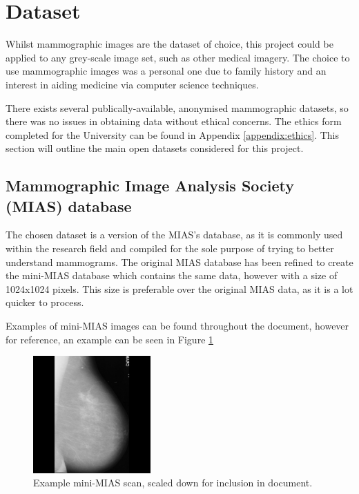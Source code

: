 \section{Dataset}

Whilst \gls{mammographic images} are the dataset of choice, this project could be applied to any grey-scale image set, such as other medical imagery. The choice to use \gls{mammographic images} was a personal one due to family history and an interest in aiding medicine via computer science techniques.

There exists several publically-available, anonymised mammographic datasets, so there was no issues in obtaining data without ethical concerns. The ethics form completed for the University can be found in Appendix \ref{appendix:ethics}. This section will outline the main open datasets considered for this project.

\subsection{Mammographic Image Analysis Society (MIAS) database}

The chosen dataset is a version of the \acrfull{MIAS}'s database, as it is commonly used within the research field and compiled for the sole purpose of trying to better understand mammograms. The original \acrshort{MIAS} database has been refined to create the mini-\acrshort{MIAS} database which contains the same data, however with a size of 1024x1024 pixels. This size is preferable over the original \acrshort{MIAS} data, as it is a lot quicker to process.

Examples of mini-\acrshort{MIAS} images can be found throughout the document, however for reference, an example can be seen in Figure \ref{fig:mini-mias}

\begin{figure}[H]
  \centering
  \includegraphics[width=0.4\textwidth]{Chapter2/tools/mias.jpg}
  \caption{Example mini-MIAS scan, scaled down for inclusion in document.}
  \label{fig:mini-mias}
\end{figure}

